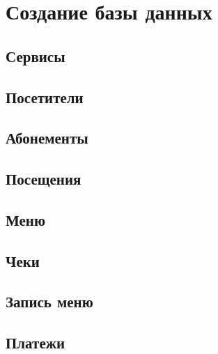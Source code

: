 \documentclass[a4paper]{article}
\begin{document}
\section{Создание базы данных}
\subsection{Сервисы}



\subsection{Посетители}



\subsection{Абонементы}



\subsection{Посещения}



\subsection{Меню}



\subsection{Чеки}



\subsection{Запись меню}



\subsection{Платежи}


\end{document}
